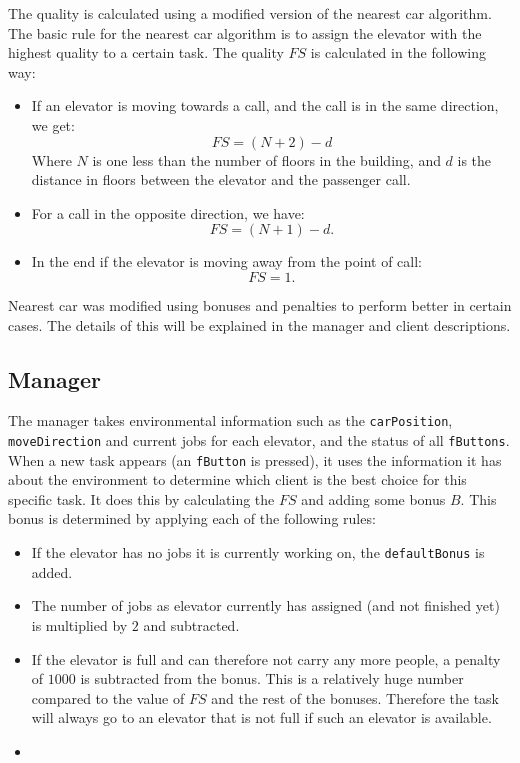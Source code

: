 \documentclass[a4paper,10pt,twocolumn]{article}
\begin{document}
The quality is calculated using a modified version of the nearest car algorithm. The basic rule for the nearest car algorithm is to assign the elevator with the highest quality to a certain task. The quality $FS$ is calculated in the following way:
\begin{itemize}
 \item If an elevator is moving towards a call, and the call is in the same direction, we get:
\begin{equation}
 FS = (N + 2) - d
\end{equation}
 Where $N$ is one less than the number of floors in the building, and $d$ is the distance in floors between the elevator and the passenger call.
 \item For a call in the opposite direction, we have:
\begin{equation}
 FS = (N + 1) - d.
\end{equation}
 \item In the end if the elevator is moving away from the point of call: 
 \begin{equation}
  FS = 1.
 \end{equation}
\end{itemize}
Nearest car was modified using bonuses and penalties to perform better in certain cases. The details of this will be explained in the manager and client descriptions.


\subsection{Manager}
The manager takes environmental information such as the \texttt{carPosition}, \texttt{moveDirection} and current jobs for each elevator, and the status of all \texttt{fButtons}. When a new task appears (an \texttt{fButton} is pressed), it uses the information it has about the environment to determine which client is the best choice for this specific task. It does this by calculating the $FS$ and adding some bonus $B$. This bonus is determined by applying each of the following rules:
\begin{itemize}
 \item If the elevator has no jobs it is currently working on, the \texttt{defaultBonus} is added.
 \item The number of jobs as elevator currently has assigned (and not finished yet) is multiplied by $2$ and subtracted.
 \item If the elevator is full and can therefore not carry any more people, a penalty of $1000$ is subtracted from the bonus. This is a relatively huge number compared to the value of $FS$ and the rest of the bonuses. Therefore the task will always go to an elevator that is not full if such an elevator is available.
 \item 
\end{itemize}
\end{document}
